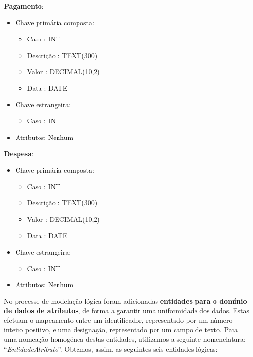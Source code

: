 \documentclass[a4paper,12pt]{scrreprt}
\begin{document}
        \textbf{Pagamento}:
        \begin{itemize}
            \item Chave primária composta:
                \begin{itemize}
                    \item Caso : INT
                    \item Descrição : TEXT(300)
                    \item Valor : DECIMAL(10,2)
                    \item Data : DATE
                \end{itemize}
            \item Chave estrangeira:
                \begin{itemize}
                    \item Caso : INT
                \end{itemize}
            \item Atributos: Nenhum
        \end{itemize}

        \vspace{0.5cm}

        \textbf{Despesa}:
        \begin{itemize}
            \item Chave primária composta:
                \begin{itemize}
                    \item Caso : INT
                    \item Descrição : TEXT(300)
                    \item Valor : DECIMAL(10,2)
                    \item Data : DATE
                \end{itemize}
            \item Chave estrangeira:
                \begin{itemize}
                    \item Caso : INT
                \end{itemize}
            \item Atributos: Nenhum
        \end{itemize}

        \clearpage

        No processo de modelação lógica foram adicionadas \textbf{entidades para o domínio de dados de atributos}, de forma a garantir uma uniformidade dos dados. Estas efetuam o mapeamento entre um identificador, representado por um número inteiro positivo, e uma designação, representado por um campo de texto. Para uma nomeação homogénea destas entidades, utilizamos a seguinte nomenclatura: “\textit{EntidadeAtributo}”. Obtemos, assim, as seguintes seis entidades lógicas:
\end{document}
